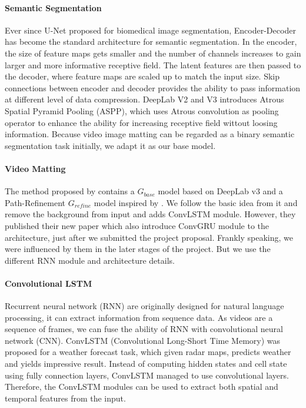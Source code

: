 \documentclass[final]{cvpr}
\begin{document}
\paragraph{Semantic Segmentation}

Ever since U-Net \cite{Ronneberger2015UNetCN} proposed for biomedical image segmentation, Encoder-Decoder has become the standard architecture for semantic segmentation.
In the encoder, the size of feature maps gets smaller and the number of channels increases to gain larger and more informative receptive field.
The latent features are then passed to the decoder, where feature maps are scaled up to match the input size.
Skip connections between encoder and decoder provides the ability to pass information at different level of data compression.
DeepLab V2 \cite{Chen2018DeepLabSI} and V3 \cite{chenRethinkingAtrousConvolution2017} introduces Atrous Spatial Pyramid Pooling (ASPP), which uses Atrous convolution as pooling operator to enhance the ability for increasing receptive field wittout loosing information.
Because video image matting can be regarded as a binary semantic segmentation task initially, we adapt it as our base model.

\paragraph{Video Matting}

The method proposed by \cite{linRealTimeHighResolutionBackground2020a} contains a $G_{base}$ model based on DeepLab v3 and a Path-Refinement $G_{refine}$ model inspired by \cite{kirillovPointRendImageSegmentation2020}.
We follow the basic idea from it and remove the background from input and adds ConvLSTM module.
However, they published their new paper \cite{linRobustHighResolutionVideo2021} which also introduce ConvGRU module to the architecture, just after we submitted the project proposal.
Frankly speaking, we were influenced by them in the later stages of the project.
But we use the different RNN module and architecture details.

\paragraph{Convolutional LSTM}

Recurrent neural network (RNN) are originally designed for natural language processing, it can extract information from sequence data.
As videos are a sequence of frames, we can fuse the ability of RNN with convolutional neural network (CNN).
ConvLSTM (Convolutional Long-Short Time Memory) \cite{shiConvolutionalLSTMNetwork2015} was proposed for a weather forecast task, which given radar maps, predicts weather and yields impressive result.
Instead of computing hidden states and cell state using fully connection layers, ConvLSTM managed to use convolutional layers.
Therefore, the ConvLSTM modules can be used to extract both spatial and temporal features from the input.
\end{document}
